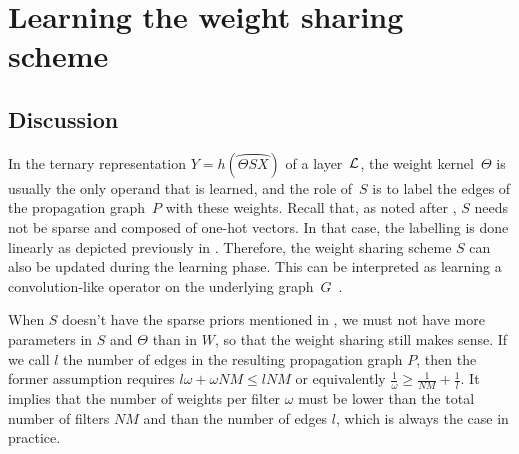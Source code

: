 \section{Learning the weight sharing scheme}
\label{sec:learningscheme}

\subsection{Discussion}

In the ternary representation $Y = h(\wideparen{\Theta S X})$ of a layer~$\mathcal{L}$, the weight kernel~$\Theta$ is usually the only operand that is learned, and the role of~$S$ is to label the edges of the propagation graph~$P$ with these weights. Recall that, as noted after , $S$ needs not be sparse and composed of one-hot vectors. In that case, the labelling is done linearly as depicted previously in . Therefore, the weight sharing scheme $S$ can also be updated during the learning phase. This can be interpreted as learning a convolution-like operator on the underlying graph~$G$~\citep{vialatte2017learning}.

\begin{remark}
When $S$ doesn't have the sparse priors mentioned in , we must not have more parameters in $S$ and $\Theta$ than in $W$, so that the weight sharing still makes sense. If we call $l$ the number of edges in the resulting propagation graph $P$, then the former assumption requires $l\omega + \omega NM \leq lNM$ or equivalently $\frac{1}{\omega} \geq \frac{1}{NM} + \frac{1}{l}$. It implies that the number of weights per filter $\omega$ must be lower than the total number of filters $NM$ and than the number of edges $l$, which is always the case in practice.
\end{remark}



